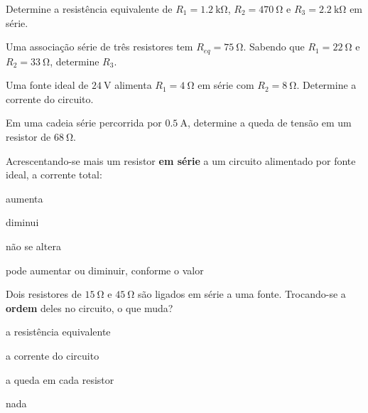 \blocofixacao
\begin{questao}[1]{}

Determine a resistência equivalente de $R_1=\SI{1.2}{\kilo\ohm}$,
$R_2=\SI{470}{\ohm}$ e $R_3=\SI{2.2}{\kilo\ohm}$ em série.


\end{questao}
\begin{questao}[1]{}

Uma associação série de três resistores tem $R_{eq}=\SI{75}{\ohm}$. Sabendo que
$R_1=\SI{22}{\ohm}$ e $R_2=\SI{33}{\ohm}$, determine $R_3$.


\end{questao}
\begin{questao}[1]{}

Uma fonte ideal de $\SI{24}{\volt}$ alimenta $R_1=\SI{4}{\ohm}$ em série com
$R_2=\SI{8}{\ohm}$. Determine a corrente do circuito.


\end{questao}
\begin{questao}[1]{}

Em uma cadeia série percorrida por $\SI{0.5}{\ampere}$, determine a queda de
tensão em um resistor de $\SI{68}{\ohm}$.


\end{questao}
\begin{questao}[1]{}

Acrescentando-se mais um resistor \textbf{em série} a um circuito alimentado
por fonte ideal, a corrente total:
\begin{alternativas}[2]
\item aumenta
\item diminui
\item não se altera
\item pode aumentar ou diminuir, conforme o valor
\end{alternativas}


\end{questao}
\begin{questao}[1]{}

Dois resistores de $\SI{15}{\ohm}$ e $\SI{45}{\ohm}$ são ligados em série a uma
fonte. Trocando-se a \textbf{ordem} deles no circuito, o que muda?
\begin{alternativas}[2]
\item a resistência equivalente
\item a corrente do circuito
\item a queda em cada resistor
\item nada
\end{alternativas}


\end{questao}

